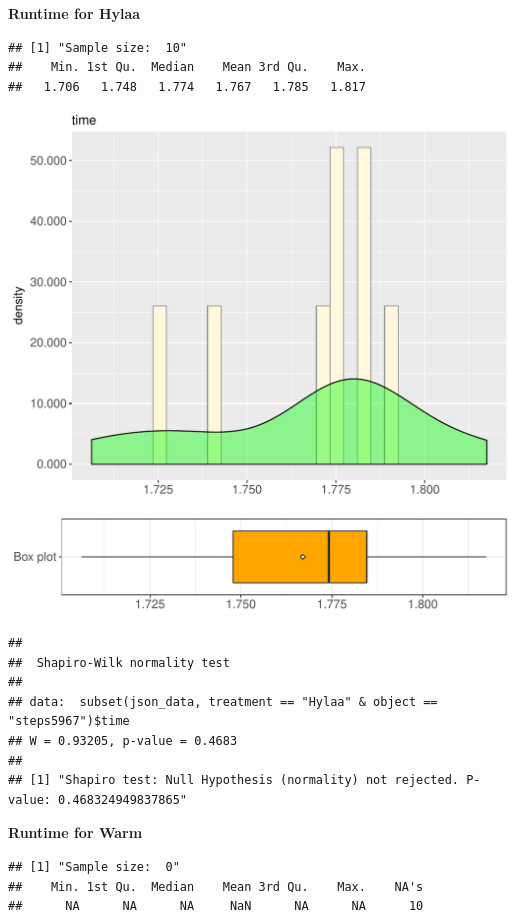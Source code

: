 \documentclass{article}\usepackage[]{graphicx}\usepackage[]{color}
\makeatletter
\def\maxwidth{ %
  \ifdim\Gin@nat@width>\linewidth
    \linewidth
  \else
    \Gin@nat@width
  \fi
}
\newenvironment{kframe}{%
 \def\at@end@of@kframe{}%
 \ifinner\ifhmode%
  \def\at@end@of@kframe{\end{minipage}}%
  \begin{minipage}{\columnwidth}%
 \fi\fi%
 \def\FrameCommand##1{\hskip\@totalleftmargin \hskip-\fboxsep
 \colorbox{shadecolor}{##1}\hskip-\fboxsep
     \hskip-\linewidth \hskip-\@totalleftmargin \hskip\columnwidth}%
 \MakeFramed {\advance\hsize-\width
   \@totalleftmargin\z@ \linewidth\hsize
   \@setminipage}}%
 {\par\unskip\endMakeFramed%
 \at@end@of@kframe}
\newenvironment{knitrout}{}{} %
\makeatother
\begin{document}
 \textbf{Runtime for Hylaa}
\begin{knitrout}
\color{fgcolor}\begin{kframe}
\begin{verbatim}
## [1] "Sample size:  10"
##    Min. 1st Qu.  Median    Mean 3rd Qu.    Max. 
##   1.706   1.748   1.774   1.767   1.785   1.817
\end{verbatim}
\end{kframe}
\includegraphics[width=\maxwidth]{figure/RH1_Hylaa_steps5967-1} 
\begin{kframe}\begin{verbatim}
## 
## 	Shapiro-Wilk normality test
## 
## data:  subset(json_data, treatment == "Hylaa" & object == "steps5967")$time
## W = 0.93205, p-value = 0.4683
## 
## [1] "Shapiro test: Null Hypothesis (normality) not rejected. P-value: 0.468324949837865"
\end{verbatim}
\end{kframe}
\end{knitrout}
 \textbf{Runtime for Warm}
\begin{knitrout}
\color{fgcolor}\begin{kframe}
\begin{verbatim}
## [1] "Sample size:  0"
##    Min. 1st Qu.  Median    Mean 3rd Qu.    Max.    NA's 
##      NA      NA      NA     NaN      NA      NA      10
\end{verbatim}
\end{kframe}
\end{knitrout}
  
\end{document}
